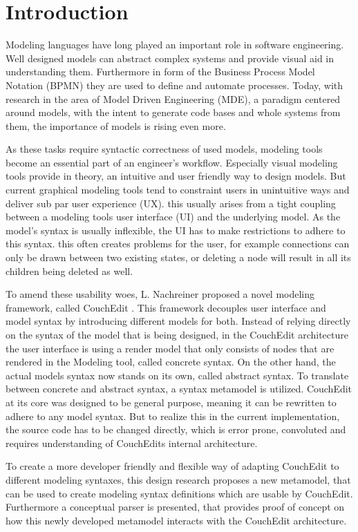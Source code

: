\chapter{Introduction}
\label{chap:introduction}


Modeling languages have long played an important role in software engineering. Well designed models can abstract complex systems and provide visual aid in understanding them. Furthermore in form of the Business Process Model Notation (BPMN) they are used to define and automate processes. Today, with research in the area of Model Driven Engineering (MDE), a paradigm centered around models, with the intent to generate code bases and whole systems from them, the importance of models is rising even more.

As these tasks require syntactic correctness of used models, modeling tools become an essential part of an engineer's workflow. Especially visual modeling tools provide in theory, an intuitive and user friendly way to design models. But current graphical modeling tools tend to constraint users in unintuitive ways and deliver sub par user experience (UX). this usually arises from a tight coupling between a modeling tools user interface (UI) and the underlying model. As the model's syntax is usually inflexible, the UI has to make restrictions to adhere to this syntax. this often creates problems for the user, for example connections can only be drawn between two existing states, or deleting a node will result in all its children being deleted as well.

To amend these usability woes, L. Nachreiner proposed a novel modeling framework, called CouchEdit \cite{nachreiner_couchedit_2020}. This framework decouples user interface and model syntax by introducing different models for both. Instead of relying directly on the syntax of the model that is being designed, in the CouchEdit architecture the user interface is using a render model that only consists of nodes that are rendered in the Modeling tool, called concrete syntax. On the other hand, the actual models syntax now stands on its own, called abstract syntax. To translate between concrete and abstract syntax, a syntax metamodel is utilized. CouchEdit at its core was designed to be general purpose, meaning it can be rewritten to adhere to any model syntax. But to realize this in the current implementation, the source code has to be changed directly, which is error prone, convoluted and requires understanding of CouchEdits internal architecture.

To create a more developer friendly and flexible way of adapting CouchEdit to different modeling syntaxes, this design research proposes a new metamodel, that can be used to create modeling syntax definitions which are usable by CouchEdit. Furthermore a conceptual parser is presented, that provides proof of concept on how this newly developed metamodel interacts with the CouchEdit architecture.

